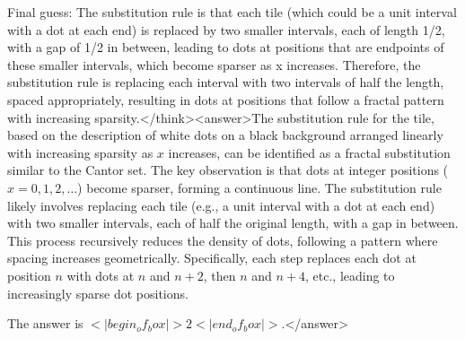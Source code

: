 Final guess: The substitution rule is that each tile (which could be a unit interval with a dot at each end) is replaced by two smaller intervals, each of length 1/2, with a gap of 1/2 in between, leading to dots at positions that are endpoints of these smaller intervals, which become sparser as x increases. Therefore, the substitution rule is replacing each interval with two intervals of half the length, spaced appropriately, resulting in dots at positions that follow a fractal pattern with increasing sparsity.</think><answer>The substitution rule for the tile, based on the description of white dots on a black background arranged linearly with increasing sparsity as \( x \) increases, can be identified as a fractal substitution similar to the Cantor set. The key observation is that dots at integer positions (\( x = 0, 1, 2, \ldots \)) become sparser, forming a continuous line. The substitution rule likely involves replacing each tile (e.g., a unit interval with a dot at each end) with two smaller intervals, each of half the original length, with a gap in between. This process recursively reduces the density of dots, following a pattern where spacing increases geometrically. Specifically, each step replaces each dot at position \( n \) with dots at \( n \) and \( n + 2 \), then \( n \) and \( n + 4 \), etc., leading to increasingly sparse dot positions.  

The answer is \(<|begin_of_box|>2<|end_of_box|>\).</answer>